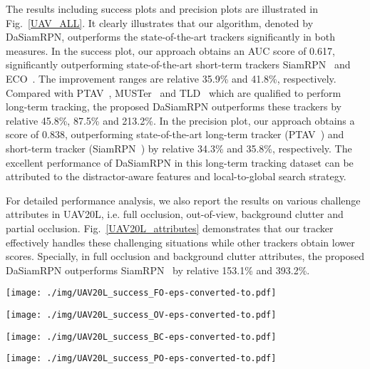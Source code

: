 \documentclass[runningheads]{llncs}
\begin{document}
The results including success plots and precision plots are illustrated in Fig.~\ref{UAV_ALL}. It clearly illustrates that our algorithm, denoted by DaSiamRPN, outperforms the state-of-the-art trackers significantly in both measures. In the success plot, our approach obtains an AUC score of 0.617, significantly outperforming state-of-the-art short-term trackers SiamRPN~\cite{SiamRPN} and ECO~\cite{ECO}. The improvement ranges are relative 35.9\% and 41.8\%, respectively. Compared with PTAV~\cite{PTAV}, MUSTer~\cite{muster} and TLD~\cite{TLD} which are qualified to perform long-term tracking, the proposed DaSiamRPN outperforms these trackers by relative 45.8\%, 87.5\% and 213.2\%.
In the precision plot, our approach obtains a score of 0.838, outperforming state-of-the-art long-term tracker (PTAV~\cite{PTAV}) and short-term tracker (SiamRPN~\cite{SiamRPN}) by relative 34.3\% and 35.8\%, respectively. The excellent performance of DaSiamRPN in this long-term tracking dataset can be attributed to the distractor-aware features and local-to-global search strategy.

For detailed performance analysis, we also report the results on various challenge attributes in UAV20L, i.e. full occlusion, out-of-view, background clutter and partial occlusion. Fig.~\ref{UAV20L_attributes} demonstrates that our tracker effectively handles these challenging situations while other trackers obtain lower scores. Specially, in full occlusion and background clutter attributes, the proposed DaSiamRPN outperforms SiamRPN~\cite{SiamRPN} by relative 153.1\% and 393.2\%.

\begin{figure*}[!tp]
 \centering
\begin{minipage}[c]{3cm}
\texttt{[image: ./img/UAV20L\_success\_FO-eps-converted-to.pdf]}
\end{minipage}\begin{minipage}[c]{3cm}
\texttt{[image: ./img/UAV20L\_success\_OV-eps-converted-to.pdf]}
\end{minipage}\begin{minipage}[c]{3cm}
\texttt{[image: ./img/UAV20L\_success\_BC-eps-converted-to.pdf]}
\end{minipage}\begin{minipage}[c]{3cm}
\texttt{[image: ./img/UAV20L\_success\_PO-eps-converted-to.pdf]}
\end{minipage}\caption{Success plots with attributes on UAV20L. Best viewed on color display.}
\label{UAV20L_attributes}

\end{figure*}
\end{document}
